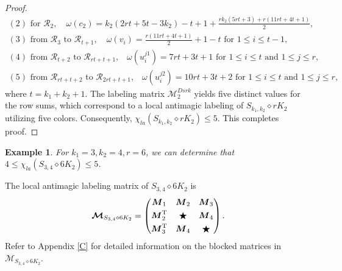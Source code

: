 \documentclass[12pt]{article}
\newtheorem{example}{Example}[section]
\begin{document}
\begin{proof}
\begin{equation*}
\begin{array}{l}
(2)\text{ for $\mathcal{R}_{2}$},\quad\omega(c_{2})=k_{2}(2rt+5t-3k_{2})-t+1+\frac{rk_{2}(5rt+3)+r(11rt+4t+1)}{2},\\[6pt]
(3)\text{ from $\mathcal{R}_{3}$ to $\mathcal{R}_{t+1}$},\quad\omega(v_{i})=\frac{r(11rt+4t+1)}{2}+1-t\text{ for $1\leq i\leq t-1$},\\[6pt]
(4)\text{ from $\mathcal{R}_{t+2}$ to $\mathcal{R}_{rt+t+1}$,}\quad\omega(u_{i}^{j1})=7rt+3t+1\text{ for $1\leq i\leq t$ and $1\leq j\leq r$},\\[4pt]
(5)\text{ from $\mathcal{R}_{rt+t+2}$ to $\mathcal{R}_{2rt+t+1}$,}\quad\omega(u_{i}^{j2})=10rt+3t+2\text{ for $1\leq i\leq t$ and $1\leq j\leq r$},
\end{array}
\end{equation*}
where $t=k_{1}+k_{2}+1$. The labeling matrix $\boldsymbol{\mathcal{M}}^{Dsrk}_{2}$ yields five distinct values for the row sums, which correspond to a local antimagic labeling of $S_{k_{1},k_{2}}\diamond rK_{2}$ utilizing five colors. Consequently, $\chi_{la}(S_{k_{1},k_{2}}\diamond rK_{2})\leq 5$. This completes proof.
\end{proof}

\begin{example}\label{E4}
 For $k_{1}=3,k_{2}=4,r=6$, we can determine that $4\leq\chi_{la}(S_{3,4}\diamond 6K_{2})\leq 5$.
\end{example}
The local antimagic labeling matrix of $S_{3,4}\diamond 6K_{2}$ is
\begin{equation*}
\boldsymbol{\mathcal{M}}_{S_{3,4}\diamond 6K_{2}}=\begin{pmatrix}
		\boldsymbol{M}_{1} &  \boldsymbol{M}_{2} &  \boldsymbol{M}_{3}\\[3pt]
		\boldsymbol{M}_{2}^{\rm{T}} & \bigstar & \boldsymbol{M}_{4}\\[3pt]
		\boldsymbol{M}_{3}^{\rm{T}}&  \boldsymbol{M}_{4} & \bigstar
	\end{pmatrix}.
\end{equation*}
Refer to Appendix \ref{C} for detailed information on the blocked matrices in $\boldsymbol{\mathcal{M}}_{S_{3,4}\diamond 6K_{2}}$.
\end{document}
